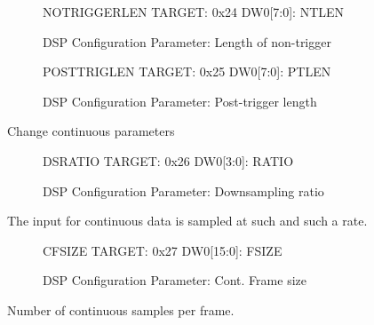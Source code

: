 \begin{figure}[h]
\begin{dspcmd}{NOTRIGGERLEN}
TARGET: 0x24
DW0[7:0]: NTLEN
\end{dspcmd}
\caption{DSP Configuration Parameter: Length of non-trigger}
\end{figure}

\begin{figure}[h]
\begin{dspcmd}{POSTTRIGLEN}
TARGET: 0x25
DW0[7:0]: PTLEN
\end{dspcmd}
\caption{DSP Configuration Parameter: Post-trigger length}
\end{figure}

Change continuous parameters

\begin{figure}[h]
\begin{dspcmd}{DSRATIO}
TARGET: 0x26
DW0[3:0]: RATIO
\end{dspcmd}
\caption{DSP Configuration Parameter: Downsampling ratio}
\end{figure}
The input for continuous data is sampled at such and such a rate. 


\begin{figure}[h]
\begin{dspcmd}{CFSIZE}
TARGET: 0x27
DW0[15:0]: FSIZE
\end{dspcmd}
\caption{DSP Configuration Parameter: Cont. Frame size}
\end{figure}
Number of continuous samples per frame.





